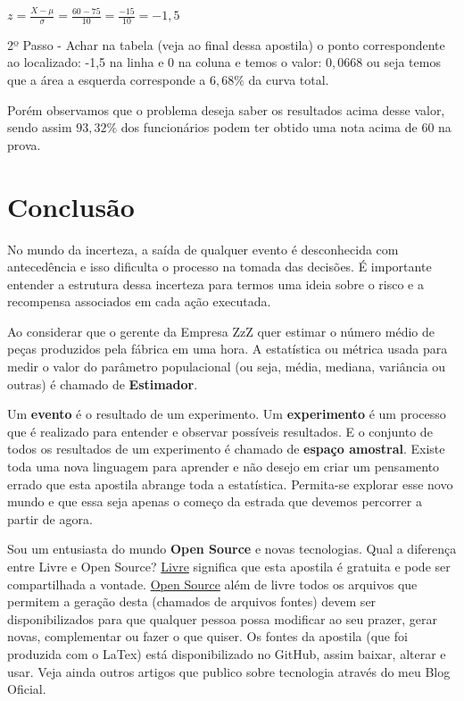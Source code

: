 \documentclass[a4paper,11pt]{article}
\begin{document}
$z = \frac{X - \mu}{\sigma} = \frac{60 - 75}{10} = \frac{-15}{10} = -1,5$

2º Passo - Achar na tabela (veja ao final dessa apostila) o ponto correspondente ao localizado: -1,5 na linha e 0 na coluna e temos o valor: $0,0668$ ou seja temos que a área a esquerda corresponde a $6,68\%$ da curva total. 

Porém observamos que o problema deseja saber os resultados acima desse valor, sendo assim $93,32\%$ dos funcionários podem ter obtido uma nota acima de 60 na prova.

\section{Conclusão}
No mundo da incerteza, a saída de qualquer evento é desconhecida com antecedência e isso dificulta o processo na tomada das decisões. É importante entender a estrutura dessa incerteza para termos uma ideia sobre o risco e a recompensa associados em cada ação executada. 

Ao considerar que o gerente da Empresa ZzZ quer estimar o número médio de peças produzidos pela fábrica em uma hora. A estatística ou métrica usada para medir o valor do parâmetro populacional (ou seja, média, mediana, variância ou outras) é chamado de \textbf{Estimador}.

Um \textbf{evento} é o resultado de um experimento. Um \textbf{experimento} é um processo que é realizado para entender e observar possíveis resultados. E o conjunto de todos os resultados de um experimento é chamado de \textbf{espaço amostral}. Existe toda uma nova linguagem para aprender e não desejo em criar um pensamento errado que esta apostila abrange toda a estatística. Permita-se explorar esse novo mundo e que essa seja apenas o começo da estrada que devemos percorrer a partir de agora. 

Sou um entusiasta do mundo \textbf{Open Source} e novas tecnologias. Qual a diferença entre Livre e Open Source? \underline{Livre} significa que esta apostila é gratuita e pode ser compartilhada a vontade. \underline{Open Source} além de livre todos os arquivos que permitem a geração desta (chamados de arquivos fontes) devem ser disponibilizados para que qualquer pessoa possa modificar ao seu prazer, gerar novas, complementar ou fazer o que quiser. Os fontes da apostila (que foi produzida com o LaTex) está disponibilizado no GitHub\cite{fernandoanselmo}, assim baixar, alterar e usar. Veja ainda outros artigos que publico sobre tecnologia através do meu Blog Oficial\cite{fernandoanselmo}.
\end{document}
